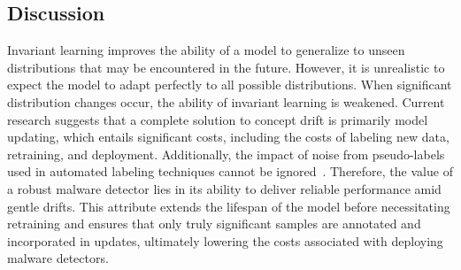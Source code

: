 \subsection{Discussion}
Invariant learning improves the ability of a model to generalize to unseen distributions that may be encountered in the future. However, it is unrealistic to expect the model to adapt perfectly to all possible distributions. When significant distribution changes occur, the ability of invariant learning is weakened. Current research suggests that a complete solution to concept drift is primarily model updating, which entails significant costs, including the costs of labeling new data, retraining, and deployment. Additionally, the impact of noise from pseudo-labels used in automated labeling techniques cannot be ignored~\cite{labelless}. Therefore, the value of a robust malware detector lies in its ability to deliver reliable performance amid gentle drifts. This attribute extends the lifespan of the model before necessitating retraining and ensures that only truly significant samples are annotated and incorporated in updates, ultimately lowering the costs associated with deploying malware detectors.